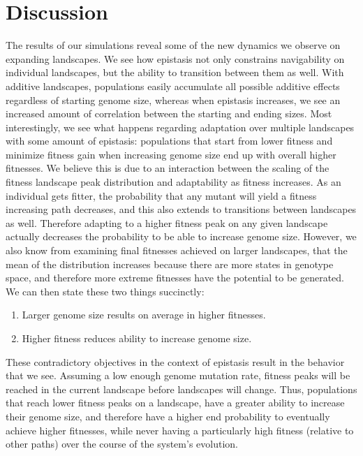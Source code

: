 \documentclass[paper=a4, fontsize=11pt,twoside]{scrartcl}       %
\begin{document}
\pagebreak

\section*{Discussion}

The results of our simulations reveal some of the new dynamics we observe on expanding landscapes. We see how epistasis not only constrains navigability on individual landscapes, but the ability to transition between them as well. With additive landscapes, populations easily accumulate all possible additive effects regardless of starting genome size, whereas when epistasis increases, we see an increased amount of correlation between the starting and ending sizes. Most interestingly, we see what happens regarding adaptation over multiple landscapes with some amount of epistasis: populations that start from lower fitness and minimize fitness gain when increasing genome size end up with overall higher fitnesses. We believe this is due to an interaction between the scaling of the fitness landscape peak distribution and adaptability as fitness increases. As an individual gets fitter, the probability that any mutant will yield a fitness increasing path decreases, and this also extends to transitions between landscapes as well. Therefore adapting to a higher fitness peak on any given landscape actually decreases the probability to be able to increase genome size. However, we also know from examining final fitnesses achieved on larger landscapes, that the mean of the distribution increases because there are more states in genotype space, and therefore more extreme fitnesses have the potential to be generated. We can then state these two things succinctly:
	\begin{enumerate}
		\item Larger genome size results on average in higher fitnesses. 
	
		\item Higher fitness reduces ability to increase genome size.
	\end{enumerate}
These contradictory objectives in the context of epistasis result in the behavior that we see. Assuming a low enough genome mutation rate, fitness peaks will be reached in the current landscape before landscapes will change. Thus, populations that reach lower fitness peaks on a landscape, have a greater ability to increase their genome size, and therefore have a higher end probability to eventually achieve higher fitnesses, while never having a particularly high fitness (relative to other paths) over the course of the system's evolution. 
\end{document}
